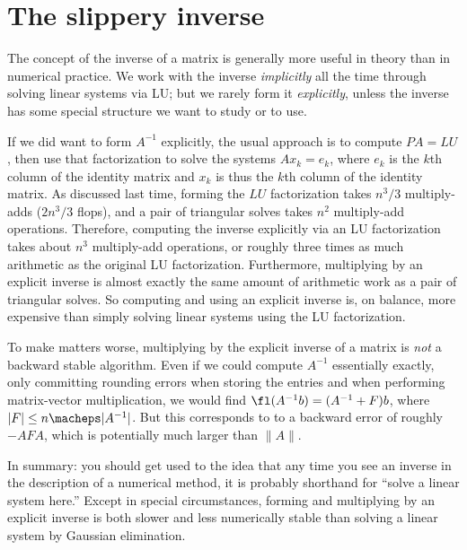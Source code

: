 \section{The slippery inverse}

The concept of the inverse of a matrix is generally more useful in
theory than in numerical practice.  We work with the inverse
{\em implicitly} all the time through solving linear systems via LU; but
we rarely form it {\em explicitly}, unless the inverse has some
special structure we want to study or to use.

If we did want to form $A^{-1}$ explicitly, the usual approach is to
compute $PA = LU$, then use that factorization to solve the systems
$Ax_k = e_k$, where $e_k$ is the $k$th column of the identity matrix
and $x_k$ is thus the $k$th column of the identity matrix.  As
discussed last time, forming the $LU$ factorization takes $n^3/3$
multiply-adds ($2n^3/3$ flops), and a pair of triangular solves takes
$n^2$ multiply-add operations.  Therefore, computing the inverse
explicitly via an LU factorization takes about $n^3$ multiply-add
operations, or roughly three times as much arithmetic as the original
LU factorization.  Furthermore, multiplying by an explicit inverse is
almost exactly the same amount of arithmetic work as a pair of
triangular solves.  So computing and using an explicit inverse is, on
balance, more expensive than simply solving linear systems using the
LU factorization.

To make matters worse, multiplying by the explicit inverse of a matrix
is {\em not} a backward stable algorithm.  Even if we could compute
$A^{-1}$ essentially exactly, only committing rounding errors when
storing the entries and when performing matrix-vector multiplication,
we would find $\fl(A^{-1} b) = (A^{-1} + F)b$, where $|F| \leq n
\macheps |A^{-1}|$.  But this corresponds to to a backward error of
roughly $-AFA$, which is potentially much larger than $\|A\|$.

In summary: you should get used to the idea that any time you see an
inverse in the description of a numerical method, it is probably
shorthand for ``solve a linear system here.''  Except in special
circumstances, forming and multiplying by an explicit inverse is both
slower and less numerically stable than solving a linear system by
Gaussian elimination.
